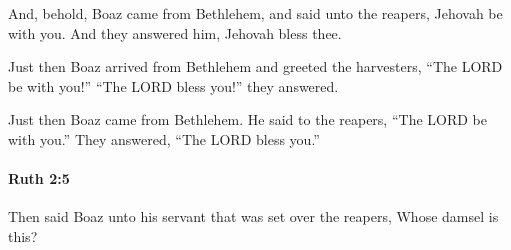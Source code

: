 			\begin{versebox}
					\item[BHS] 
					\item[LXX] 
					\item[ASV] And, behold, Boaz came from Bethlehem, and said unto the reapers, Jehovah be with you. And they answered him, Jehovah bless thee.
					\item[NIV] Just then Boaz arrived from Bethlehem and greeted the harvesters, “The LORD be with you!” “The LORD bless you!” they answered.
					\item[NRSV] Just then Boaz came from Bethlehem. He said to the reapers, “The LORD be with you.” They answered, “The LORD bless you.”
			\end{versebox}

		\paragraph{Ruth 2:5} %
			\label{RUTH-2-5}

			Then said Boaz unto his servant that was set over the reapers, Whose damsel is this?

